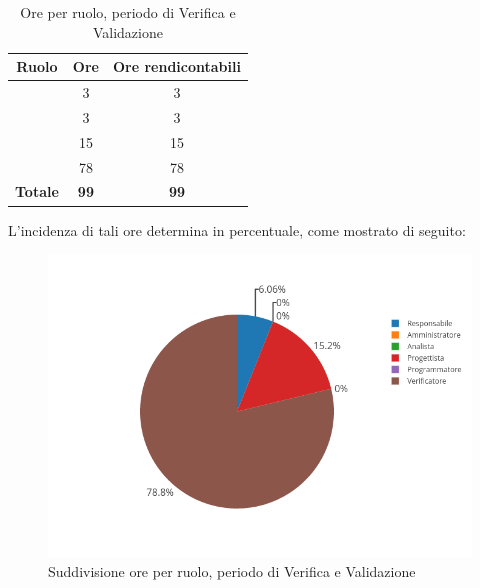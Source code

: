 \begin{table}[H]
	\begin{center}
		\begin{tabular}{|c|c|c|}
			\hline
			\textbf{Ruolo}	& \textbf{Ore}	& \textbf{Ore rendicontabili} \\
			\hline
			\Res	&	3  &	3	\\
			\hline
			\Amm	&	3  &	3	\\
			\hline
			\Prog   &	15  &	15	\\
			\hline
			\Ver	&	78	&	78	\\
			\hline
			\textbf{Totale} & \textbf{99} & \textbf{99} \\
			\hline
		\end{tabular}
	\end{center}
	\caption{Ore per ruolo, periodo di Verifica e Validazione}
\end{table}

L'incidenza di tali ore determina in percentuale, come mostrato di seguito:
\begin{figure}[H]
	\centering
	\includegraphics[scale=0.6]{img/Validazione.png}
	\caption{Suddivisione ore per ruolo, periodo di Verifica e Validazione}
\end{figure}

